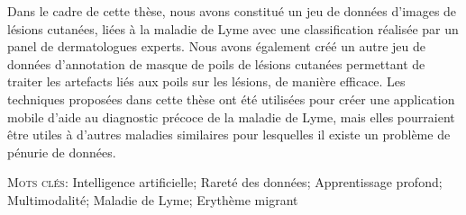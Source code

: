 Dans le cadre de cette thèse, nous avons constitué un jeu de données d'images de lésions cutanées, liées à la maladie de Lyme avec une classification réalisée par un panel de dermatologues experts. Nous avons également créé un autre jeu de données d'annotation de masque de poils de lésions cutanées permettant de traiter les artefacts liés aux poils sur les lésions, de manière efficace. Les techniques proposées dans cette thèse ont été utilisées pour créer une application mobile d'aide au diagnostic précoce de la maladie de Lyme, mais elles pourraient être utiles à d'autres maladies similaires pour lesquelles il existe un problème de pénurie de données.

\vspace{0.3cm}
\noindent \textsc{Mots clés}: Intelligence artificielle; Rareté des données; Apprentissage profond; Multimodalité; Maladie de Lyme; Erythème migrant
